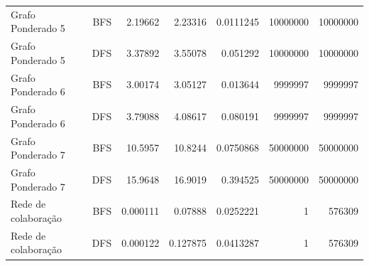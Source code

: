 \documentclass[a4paper,12pt]{article}
\begin{document}
\begin{minipage}{\textwidth}
\begin{tabular}{lrrrrrr}
Grafo Ponderado 5 & BFS & \num{2.19662} & \num{2.23316} & \num{0.0111245} & \num{10000000} & \num{10000000} \\
Grafo Ponderado 5 & DFS & \num{3.37892} & \num{3.55078} & \num{0.051292} & \num{10000000} & \num{10000000} \\
Grafo Ponderado 6 & BFS & \num{3.00174} & \num{3.05127} & \num{0.013644} & \num{9999997} & \num{9999997} \\
Grafo Ponderado 6 & DFS & \num{3.79088} & \num{4.08617} & \num{0.080191} & \num{9999997} & \num{9999997} \\
Grafo Ponderado 7 & BFS & \num{10.5957} & \num{10.8244} & \num{0.0750868} & \num{50000000} & \num{50000000} \\
Grafo Ponderado 7 & DFS & \num{15.9648} & \num{16.9019} & \num{0.394525} & \num{50000000} & \num{50000000} \\
Rede de colaboração & BFS & \num{0.000111} & \num{0.07888} & \num{0.0252221} & \num{1} & \num{576309} \\
Rede de colaboração & DFS & \num{0.000122} & \num{0.127875} & \num{0.0413287} & \num{1} & \num{576309} \\
\bottomrule
\end{tabular}
\endgroup
\end{minipage}\par\smallskip
\end{document}
